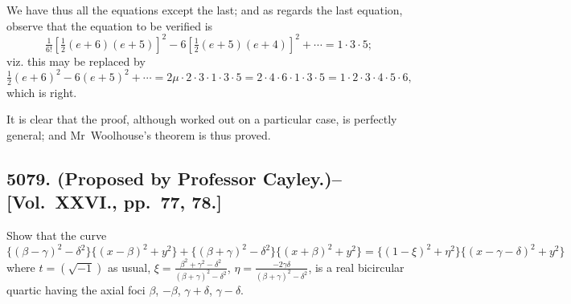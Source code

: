 \documentclass[11pt,a4paper]{book}
\begin{document}
\begin{solution}
We have thus all the equations except the last; and as regards the last equation, observe that the equation to be verified is
\[
\tfrac{1}{6!}[\tfrac{1}{2}(e+6)(e+5)]^2 - 6[\tfrac{1}{2}(e+5)(e+4)]^2 + \cdots = 1\cdot3\cdot5;
\]
viz. this may be replaced by
\[
\tfrac{1}{2}(e+6)^2 - 6(e+5)^2 + \cdots = 2\mu \cdot 2\cdot3\cdot1\cdot3\cdot5 = 2\cdot4\cdot6\cdot1\cdot3\cdot5 = 1\cdot2\cdot3\cdot4\cdot5\cdot6,
\]
which is right.

It is clear that the proof, although worked out on a particular case, is perfectly general; and Mr~Woolhouse's theorem is thus proved.
\end{solution}

\newpage

\subsection*{5079. (Proposed by Professor Cayley.)\---[Vol.~XXVI., pp.~77, 78.]}

Show that the curve
\[
\{(\beta-\gamma)^2-\delta^2\}\{(x-\beta)^2+y^2\} + \{(\beta+\gamma)^2-\delta^2\}\{(x+\beta)^2+y^2\} = \{(1-\xi)^2+\eta^2\}\{(x-\gamma-\delta)^2+y^2\}
\]
where $t = (\sqrt{-1})$ as usual, $\xi = \frac{\beta^2+\gamma^2-\delta^2}{(\beta+\gamma)^2-\delta^2}$, $\eta = \frac{-2\gamma\delta}{(\beta+\gamma)^2-\delta^2}$, is a real bicircular quartic having the axial foci $\beta$, $-\beta$, $\gamma+\delta$, $\gamma-\delta$.
\end{document}
